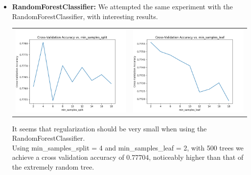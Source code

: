 \begin{itemize}
\begin{itemize}
\begin{itemize}
            \item \textbf{RandomForestClassifier:}
                We attempted the same experiment with the
                RandomForestClassifier, with interesting results.
                \begin{center}
                    \begin{tabular}{ c c }
                    \includegraphics[width=20em]{figure_6.png} &
                    \includegraphics[width=20em]{figure_7.png}
                    \end{tabular}
                \end{center}
                It seems that regularization should be very small when
                using the RandomForestClassifier. \\

                Using min_samples_split = 4 and min_samples_leaf = 2, with
                500 trees we achieve a cross validation accuracy of
                0.77704, noticeably higher than that of the extremely random
                tree.

        \end{itemize}


\end{itemize}
\end{itemize}
